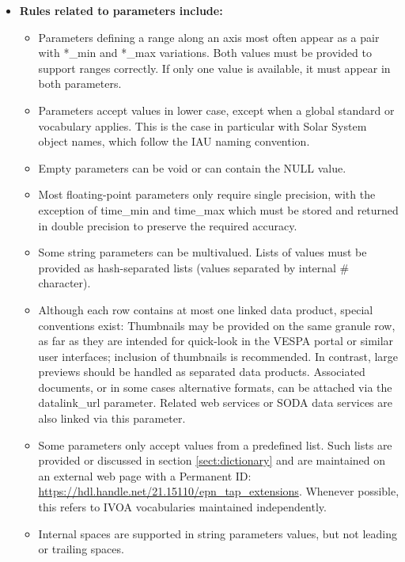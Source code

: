 \documentclass[11pt,a4paper]{ivoa}
\begin{document}
\begin{itemize}
\item \textbf{Rules related to parameters include:}

\begin{itemize}
\item Parameters defining a range along an axis most often appear as a
pair with *\_min and *\_max variations.  Both values must be provided
to support ranges correctly. If only one value is available, it must
appear in both parameters.

\item Parameters accept values in lower case, except when a global
standard or vocabulary applies. This is the case in particular with
Solar System object names, which follow the IAU naming convention.

\item Empty parameters can be void or can contain the NULL value.

\item Most floating-point parameters only require single precision,
with the exception of time\_min and time\_max which must be stored and
returned in double precision to preserve the required accuracy.

\item Some string parameters can be multivalued. Lists of values must be provided
as hash-separated lists (values separated by internal \# character).

\item Although each row contains at most one linked data product, special
conventions exist:
Thumbnails may be provided on the same granule row,
as far as they are intended for quick-look in the VESPA portal or
similar user interfaces; inclusion of thumbnails is recommended.
In contrast, large previews should be handled as separated data products.
Associated documents, or in some cases alternative formats, can be
attached via the datalink\_url parameter. Related web services or SODA
data services are also linked via this parameter.

\item Some parameters only accept values from a predefined list. Such
lists are provided or discussed in section \ref{sect:dictionary} and are maintained
on an external web page with a Permanent ID: \url{https://hdl.handle.net/21.15110/epn_tap_extensions}.
Whenever possible, this refers to IVOA vocabularies maintained independently.

\item Internal spaces are supported in string parameters values, but
not leading or trailing spaces.


\end{itemize}
\end{itemize}
\end{document}
